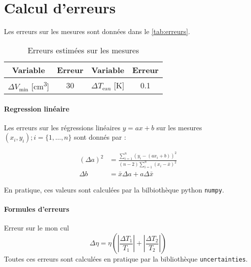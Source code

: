 \section{Calcul d'erreurs}
\label{sec:erreurs}

Les erreurs sur les mesures sont données dans le \autoref{tab:erreurs}.

\begin{table}[h]
    \centering
    \begin{tabulary}{\textwidth}{C C|C C}
        \toprule
        Variable & Erreur & Variable & Erreur \\
        \midrule
        \(\Delta V_\textrm{min}\) [\si{\centi\meter\cubed}] & 30 & \(\Delta T_\textrm{eau}\) [\si{\kelvin}] & 0.1 \\
        \bottomrule
    \end{tabulary}
    \caption{Erreurs estimées sur les mesures}
    \label{tab:erreurs}
\end{table}

\paragraph*{Regression linéaire}
Les erreurs sur les régressions linéaires \(y = ax + b\) sur les mesures \((x_i, y_i) ; i = \{1, \hdots, n\}\) sont donnés par \cite{erreursmesure}:

\begin{equation}
    \label{eq:erreur:fit}
    \begin{aligned}
        (\Delta a)^2 &= \frac{\sum_{i=1}^{n}(y_i - (a x_i + b))^2}{(n-2) \sum_{i=1}^{n}(x_i - \bar{x})^2}\\
        \Delta b &= \bar{x} \Delta a + a \Delta \bar{x}
    \end{aligned}
\end{equation}

En pratique, ces valeurs sont calculées par la bilbiothèque python \texttt{numpy}.

\paragraph*{Formules d'erreurs}

Erreur sur le mon cul
\begin{equation}
    \Delta \eta = \eta \left( \left|\frac{\Delta T_1}{T_1}\right| + \left|\frac{\Delta T_2}{T_2}\right| \right)
\end{equation}
Toutes ces erreurs sont calculées en pratique par la bibliothèque \texttt{uncertainties}.

